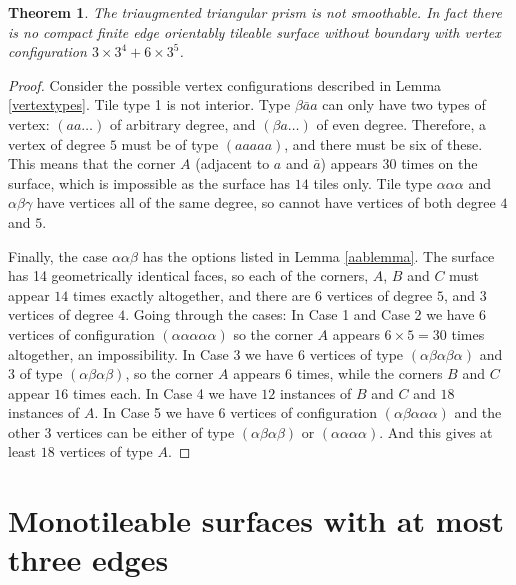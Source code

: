 \documentclass[11pt]{amsart}
\newtheorem{theorem}{Theorem}
\theoremstyle{remark}
\newcounter{case}
\begin{document}
\begin{theorem} \label{ttp}
The triaugmented triangular prism is not smoothable.  In fact
there is no compact finite edge orientably tileable surface without boundary with vertex configuration  $3 \times 3^4 + 6 \times 3^5$.
\end{theorem}
\begin{proof}
Consider the possible vertex configurations described in Lemma \ref{vertextypes}.
Tile type 1 is not interior.  
Type  $\beta \bar a a$ can only have two types of vertex: $(a a  \dots)$ of arbitrary degree, and $(\beta a \dots)$ of even degree.  Therefore, a vertex of degree $5$ must be of type $(a a a a a)$, and there must be six of these.  This means that the corner $A$ (adjacent to $a$ and $\bar a$) appears $30$ times on the surface, which is impossible as the surface has $14$ tiles only. 
Tile type $\alpha \alpha \alpha$ and $\alpha \beta \gamma$ have vertices all of the same degree, so cannot have vertices of both
degree $4$ and $5$.

Finally, the case $\alpha \alpha \beta$ has the options listed in Lemma \ref{aablemma}.
The surface has 14 geometrically identical faces, so each of the corners, $A$, $B$ and $C$ must appear $14$ times exactly altogether,  and there are $6$ vertices of degree $5$, and $3$ vertices of degree $4$.
Going through the cases:
In Case 1 and Case 2  we have  $6$ vertices of configuration $(\alpha \alpha \alpha \alpha \alpha)$ so the corner $A$ appears $6\times 5 = 30$ times altogether, an impossibility.
In Case 3 we have 6 vertices of type $(\alpha \beta \alpha \beta \alpha)$ and 3 of type $(\alpha \beta \alpha \beta)$,
so the corner $A$ appears $6$ times, while the corners $B$ and $C$ appear $16$ times each.
In Case 4 we have $12$ instances of $B$ and $C$ and $18$ instances of $A$.
In Case 5 we have 6 vertices of configuration $(\alpha \beta \alpha \alpha \alpha)$ and the other 3 vertices
can be either of type $(\alpha \beta \alpha \beta)$ or $(\alpha \alpha \alpha \alpha)$.  And this gives at least $18$
vertices of type $A$.   
\end{proof}








\section{Monotileable surfaces with at most three edges}
\end{document}
